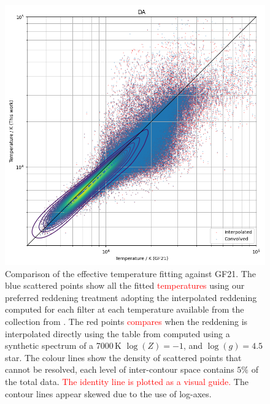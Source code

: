 \documentclass[fleqn,usenatbib]{rasti}
\begin{document}
\begin{figure}
    \centering
    \includegraphics[width=\columnwidth]{fig_03_compare_fusillo_edr3.png}
    \caption{Comparison of the effective temperature fitting against GF21. The blue scattered points show all the fitted \textcolor{red}{temperatures} using our preferred reddening treatment adopting the interpolated reddening computed for each filter at each temperature available from the collection from \citet{2010MmSAI..81..921K}. The red points \textcolor{red}{compares} when the reddening is interpolated directly using the table from \citet{2011ApJ...737..103S} computed using a synthetic spectrum of a 7000\,K  $\log(Z) = -1$, and $\log(g) = 4.5$ star. The colour lines show the density of scattered points that cannot be resolved, each level of inter-contour space contains $5\%$ of the total data. \textcolor{red}{The identity line is plotted as a visual guide.} The contour lines appear skewed due to the use of log-axes.}
    \label{fig:comparison}
\end{figure}
\end{document}
